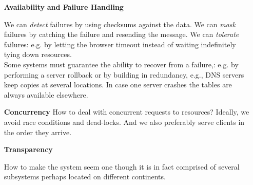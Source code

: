 \begin{enumerate}
\item[ \textbf{ Availability} \newline \textbf{and Failure Handling}]

We can \textit{detect} failures by using checksums against the data.
We can \textit{mask} failures by catching the failure and resending the message. We can \textit{tolerate} failures:  e.g. by letting the browser timeout instead of waiting indefinitely tying down resources. \\

Some systems must guarantee the ability to recover from a failure,: e.g. by performing a server rollback or by building in redundancy, e.g., DNS servers keep copies at several locations. In case one server crashes the tables are always available elsewhere. \\

\item[\textbf{Concurrency}]
How to deal with concurrent requests to resources? Ideally, we avoid race conditions and dead-locks. And we also preferably serve clients in the order they arrive. \\

\item[\textbf{Transparency}]

How to make the system seem one though it is in fact comprised of several subsystems perhaps located on different continents.\\


\end{enumerate}
